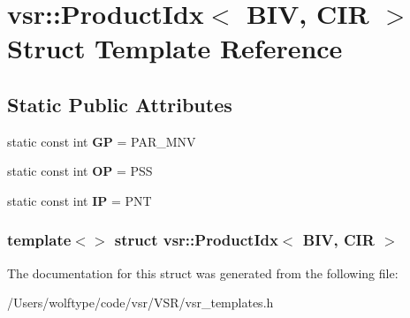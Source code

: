 \hypertarget{structvsr_1_1_product_idx_3_01_b_i_v_00_01_c_i_r_01_4}{\section{vsr\-:\-:Product\-Idx$<$ B\-I\-V, C\-I\-R $>$ Struct Template Reference}
\label{structvsr_1_1_product_idx_3_01_b_i_v_00_01_c_i_r_01_4}
}
\subsection*{Static Public Attributes}
\begin{DoxyCompactItemize}
\item 
\hypertarget{structvsr_1_1_product_idx_3_01_b_i_v_00_01_c_i_r_01_4_a523fac1154bf17b39e5b3be194e4da42}{static const int {\bfseries G\-P} = P\-A\-R\-\_\-\-M\-N\-V}\label{structvsr_1_1_product_idx_3_01_b_i_v_00_01_c_i_r_01_4_a523fac1154bf17b39e5b3be194e4da42}

\item 
\hypertarget{structvsr_1_1_product_idx_3_01_b_i_v_00_01_c_i_r_01_4_af3e8b0cacdecf61194d3b96d63e6ba7d}{static const int {\bfseries O\-P} = P\-S\-S}\label{structvsr_1_1_product_idx_3_01_b_i_v_00_01_c_i_r_01_4_af3e8b0cacdecf61194d3b96d63e6ba7d}

\item 
\hypertarget{structvsr_1_1_product_idx_3_01_b_i_v_00_01_c_i_r_01_4_a584966450e25ed514d90d1c2f16185bf}{static const int {\bfseries I\-P} = P\-N\-T}\label{structvsr_1_1_product_idx_3_01_b_i_v_00_01_c_i_r_01_4_a584966450e25ed514d90d1c2f16185bf}

\end{DoxyCompactItemize}
\subsubsection*{template$<$$>$ struct vsr\-::\-Product\-Idx$<$ B\-I\-V, C\-I\-R $>$}



The documentation for this struct was generated from the following file\-:\begin{DoxyCompactItemize}
\item 
/\-Users/wolftype/code/vsr/\-V\-S\-R/vsr\-\_\-templates.\-h\end{DoxyCompactItemize}

